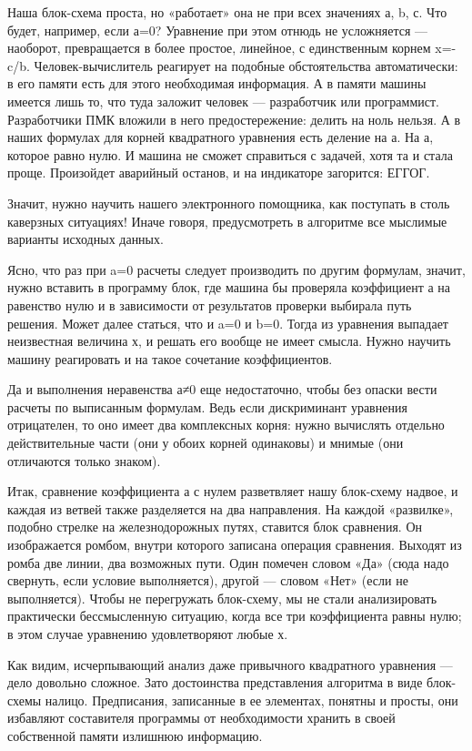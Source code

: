 \documentclass[11pt,a4paper,oneside]{article}
\begin{document}
Наша блок-схема проста, но «работает» она не при всех значениях а, b, с. Что будет, например, если а=0? Уравнение при этом отнюдь не усложняется — наоборот, превращается в более простое, линейное, с
единственным корнем x=-c/b. Человек-вычислитель реагирует на подобные обстоятельства автоматически:	в его памяти есть для этого необходимая информация. А в памяти машины имеется лишь то, что туда заложит человек — разработчик или программист. Разработчики ПМК вложили в него предостережение: делить на ноль нельзя. А в наших формулах для корней квадратного уравнения есть деление на а. На а, которое равно нулю. И машина не сможет справиться с задачей, хотя та и стала проще. Произойдет аварийный останов, и на индикаторе загорится: ЕГГОГ.

Значит, нужно научить нашего электронного помощника, как поступать в столь каверзных ситуациях! Иначе говоря, предусмотреть в алгоритме все мыслимые варианты исходных данных.

Ясно, что раз при a=0 расчеты следует производить по другим формулам, значит, нужно вставить в программу блок, где машина бы проверяла коэффициент а на равенство нулю и в зависимости от результатов проверки выбирала путь решения. Может далее статься, что и a=0 и b=0. Тогда из уравнения выпадает неизвестная величина х, и решать его вообще не имеет смысла. Нужно научить машину реагировать и на такое сочетание коэффициентов.

Да и выполнения неравенства а≠0 еще недостаточно, чтобы без опаски вести расчеты по выписанным формулам. Ведь если дискриминант уравнения отрицателен, то оно имеет два комплексных корня: нужно вычислять отдельно действительные части (они у обоих корней одинаковы) и мнимые (они отличаются только знаком).

Итак, сравнение коэффициента а с нулем разветвляет нашу блок-схему надвое, и каждая из ветвей также разделяется на два направления. На каждой «развилке», подобно стрелке на железнодорожных путях, ставится блок сравнения. Он изображается ромбом, внутри которого записана операция сравнения. Выходят из ромба две линии, два возможных пути. Один помечен словом «Да» (сюда надо свернуть, если условие выполняется), другой — словом «Нет» (если не выполняется). Чтобы не перегружать блок-схему, мы не стали анализировать практически бессмысленную ситуацию, когда все три коэффициента равны нулю; в этом случае уравнению удовлетворяют любые х.

Как видим, исчерпывающий анализ даже привычного квадратного уравнения — дело довольно сложное. Зато достоинства представления алгоритма в виде блок-схемы налицо. Предписания, записанные в ее элементах, понятны и просты, они избавляют составителя программы от необходимости хранить в своей собственной памяти излишнюю информацию.
\end{document}
